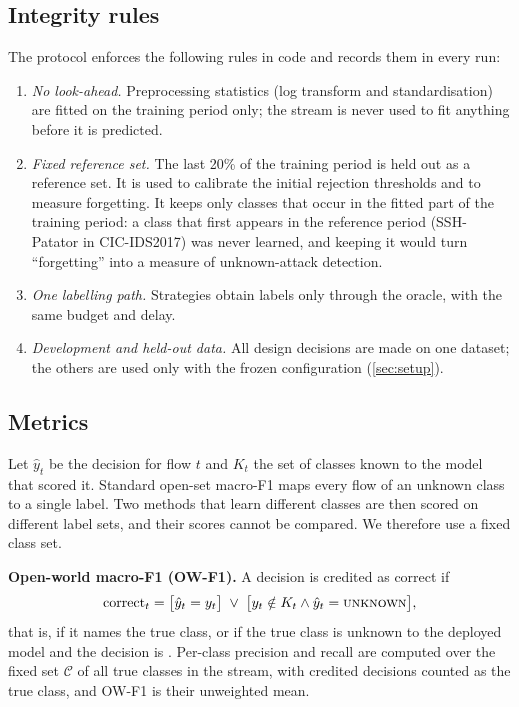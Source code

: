 \subsection{Integrity rules}
The protocol enforces the following rules in code and records them in every run:
\begin{enumerate}
  \item \emph{No look-ahead.} Preprocessing statistics (log transform and standardisation) are fitted on the
        training period only; the stream is never used to fit anything before it is predicted.
  \item \emph{Fixed reference set.} The last 20\% of the training period is held out as a reference set. It is
        used to calibrate the initial rejection thresholds and to measure forgetting. It keeps only classes that
        occur in the fitted part of the training period: a class that first appears in the reference period
        (SSH-Patator in CIC-IDS2017) was never learned, and keeping it would turn ``forgetting'' into a measure of
        unknown-attack detection.
  \item \emph{One labelling path.} Strategies obtain labels only through the oracle, with the same budget and
        delay.
  \item \emph{Development and held-out data.} All design decisions are made on one dataset; the others are used
        only with the frozen configuration (\cref{sec:setup}).
\end{enumerate}

\subsection{Metrics}
\label{sec:metrics}
Let $\hat{y}_t$ be the decision for flow $t$ and $K_t$ the set of classes known to the model that scored it.
Standard open-set macro-F1 maps every flow of an unknown class to a single \unk{} label. Two methods that learn
different classes are then scored on different label sets, and their scores cannot be compared. We therefore use
a fixed class set.

\textbf{Open-world macro-F1 (OW-F1).} A decision is credited as correct if
\begin{equation}
\label{eq:owcredit}
\text{correct}_t = \bigl[\hat{y}_t = y_t\bigr] \;\lor\; \bigl[y_t \notin K_t \land \hat{y}_t = \textsc{unknown}{}\bigr],
\end{equation}
that is, if it names the true class, or if the true class is unknown to the deployed model and the decision is
\unk{}. Per-class precision and recall are computed over the fixed set $\mathcal{C}$ of all true classes in the
stream, with credited \unk{} decisions counted as the true class, and OW-F1 is their unweighted mean.

